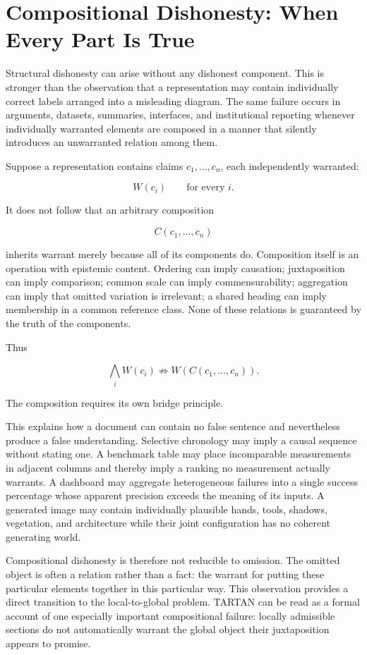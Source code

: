 \documentclass[11pt]{article}
\begin{document}
\section{Compositional Dishonesty: When Every Part Is True}
\label{sec:composition}

Structural dishonesty can arise without any dishonest component. This is stronger than the observation that a representation may contain individually correct labels arranged into a misleading diagram. The same failure occurs in arguments, datasets, summaries, interfaces, and institutional reporting whenever individually warranted elements are composed in a manner that silently introduces an unwarranted relation among them.

Suppose a representation contains claims $c_1,\ldots,c_n$, each independently warranted:

\[
W(c_i) \qquad \text{for every } i.
\]

It does not follow that an arbitrary composition

\[
C(c_1,\ldots,c_n)
\]

inherits warrant merely because all of its components do. Composition itself is an operation with epistemic content. Ordering can imply causation; juxtaposition can imply comparison; common scale can imply commensurability; aggregation can imply that omitted variation is irrelevant; a shared heading can imply membership in a common reference class. None of these relations is guaranteed by the truth of the components.

Thus

\[
\boxed{
\bigwedge_i W(c_i)
\not\Rightarrow
W\!\left(C(c_1,\ldots,c_n)\right).
}
\]

The composition requires its own bridge principle.

This explains how a document can contain no false sentence and nevertheless produce a false understanding. Selective chronology may imply a causal sequence without stating one. A benchmark table may place incomparable measurements in adjacent columns and thereby imply a ranking no measurement actually warrants. A dashboard may aggregate heterogeneous failures into a single success percentage whose apparent precision exceeds the meaning of its inputs. A generated image may contain individually plausible hands, tools, shadows, vegetation, and architecture while their joint configuration has no coherent generating world.

Compositional dishonesty is therefore not reducible to omission. The omitted object is often a relation rather than a fact: the warrant for putting these particular elements together in this particular way. This observation provides a direct transition to the local-to-global problem. TARTAN can be read as a formal account of one especially important compositional failure: locally admissible sections do not automatically warrant the global object their juxtaposition appears to promise.
\end{document}
